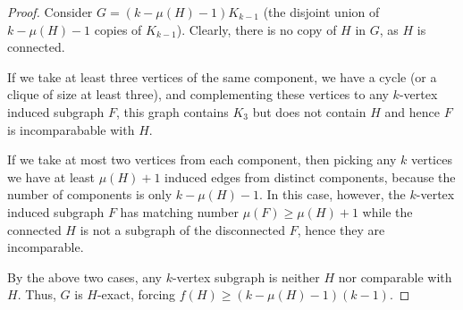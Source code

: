 \documentclass[a4paper,12pt]{article}
\begin{document}
\begin{proof}
Consider $G = (k - \mu(H) - 1)K_{k-1}$ (the disjoint union of $k - \mu(H) - 1$ copies of $K_{k-1}$).
Clearly, there is no copy of $H$ in $G$, as $H$ is connected.

If we take at least three vertices of the same component, we have a cycle (or a clique of size at least three), and complementing  these vertices to any $k$-vertex induced subgraph $F$, this graph contains $K_3$ but does not contain $H$ and hence $F$ is incomparabable with $H$.

If we take at most two vertices from each component, then
picking any $k$ vertices we have at least $\mu(H)+1$ induced edges from distinct components, because the number of components is only $k - \mu(H) - 1$.
In this case, however, the $k$-vertex induced subgraph $F$ has matching number $\mu(F)\geq \mu(H)+1$ while the connected $H$ is not a subgraph of the disconnected $F$, hence they are incomparable.
%
%

By the above two cases, any $k$-vertex subgraph is neither $H$ nor comparable with $H$.
Thus, $G$ is $H$-exact, forcing $f(H) \ge (k - \mu(H) - 1)(k-1)$.
\end{proof}



\end{document}
